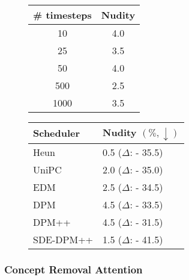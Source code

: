 \begin{figure}
    \begin{minipage}{0.4\linewidth}
        \centering
        \footnotesize
        \vspace{-0.cm}
        \begin{tabular}{c|c}
        \toprule
            \# timesteps & Nudity \\ \midrule
            10 & 4.0 \\
            25 & 3.5 \\
            50 & 4.0 \\
            500 & 2.5 \\
            1000 & 3.5 \\
            \bottomrule
        \end{tabular}
        \label{tab: sampling timesteps}
    \end{minipage}  
    \hfill
    \begin{minipage}{0.57\linewidth} 
        \centering
        \vspace{-0.15cm}
        \footnotesize
        \begin{tabular}{l | l}
        \toprule
            Scheduler & Nudity $(\%, \downarrow)$  \\ \midrule
            Heun & 0.5 ($\Delta$: - 35.5) \\
            UniPC \cite{zhao2024unipc} & 2.0 ($\Delta$: - 35.0) \\
            EDM \cite{karras2022elucidating} & 2.5 ($\Delta$: - 34.5) \\
            DPM \cite{lu2022dpm} & 4.5 ($\Delta$: - 33.5) \\
            DPM++ \cite{lu2022dpm++} & 4.5 ($\Delta$: - 31.5) \\
            SDE-DPM++ \cite{lu2022dpm++} & 1.5 ($\Delta$: - 41.5) \\
             \bottomrule
        \end{tabular}
        \label{tab: schedulers}
    \end{minipage}  
\end{figure}



\subsubsection{Concept Removal Attention}

